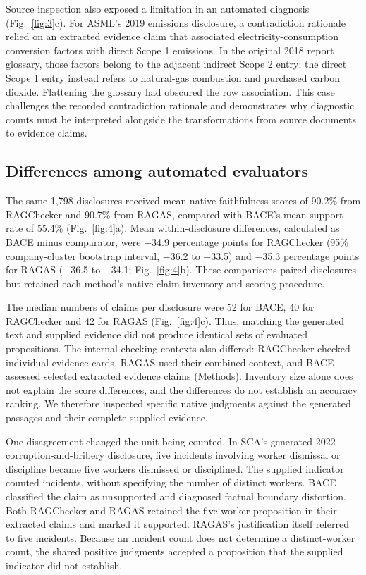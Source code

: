 \documentclass[11pt,a4paper]{article}
\begin{document}
Source inspection also exposed a limitation in an automated diagnosis (Fig.~\ref{fig:3}c). For ASML's 2019 emissions disclosure, a contradiction rationale relied on an extracted evidence claim that associated electricity-consumption conversion factors with direct Scope 1 emissions. In the original 2018 report glossary, those factors belong to the adjacent indirect Scope 2 entry; the direct Scope 1 entry instead refers to natural-gas combustion and purchased carbon dioxide. Flattening the glossary had obscured the row association. This case challenges the recorded contradiction rationale and demonstrates why diagnostic counts must be interpreted alongside the transformations from source documents to evidence claims.

\subsection*{Differences among automated evaluators}

The same 1,798 disclosures received mean native faithfulness scores of 90.2\% from RAGChecker and 90.7\% from RAGAS, compared with BACE's mean support rate of 55.4\% (Fig.~\ref{fig:4}a). Mean within-disclosure differences, calculated as BACE minus comparator, were \ensuremath{-}34.9 percentage points for RAGChecker (95\% company-cluster bootstrap interval, \ensuremath{-}36.2 to \ensuremath{-}33.5) and \ensuremath{-}35.3 percentage points for RAGAS (\ensuremath{-}36.5 to \ensuremath{-}34.1; Fig.~\ref{fig:4}b). These comparisons paired disclosures but retained each method's native claim inventory and scoring procedure.

The median numbers of claims per disclosure were 52 for BACE, 40 for RAGChecker and 42 for RAGAS (Fig.~\ref{fig:4}c). Thus, matching the generated text and supplied evidence did not produce identical sets of evaluated propositions. The internal checking contexts also differed: RAGChecker checked individual evidence cards, RAGAS used their combined context, and BACE assessed selected extracted evidence claims (Methods). Inventory size alone does not explain the score differences, and the differences do not establish an accuracy ranking. We therefore inspected specific native judgments against the generated passages and their complete supplied evidence.

One disagreement changed the unit being counted. In SCA's generated 2022 corruption-and-bribery disclosure, five incidents involving worker dismissal or discipline became five workers dismissed or disciplined. The supplied indicator counted incidents, without specifying the number of distinct workers. BACE classified the claim as unsupported and diagnosed factual boundary distortion. Both RAGChecker and RAGAS retained the five-worker proposition in their extracted claims and marked it supported. RAGAS's justification itself referred to five incidents. Because an incident count does not determine a distinct-worker count, the shared positive judgments accepted a proposition that the supplied indicator did not establish.
\end{document}
